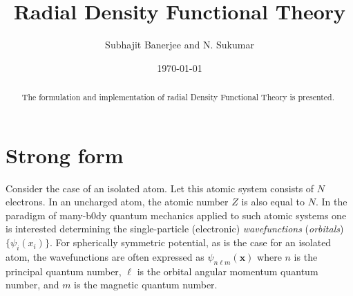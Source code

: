 \documentclass[12pt,dvipsnames]{article}
\newcommand{\vm}[1]{\mathbf{#1}}
\newcommand{\vx}{\vm{x}}
\begin{document}
\title{Radial Density Functional Theory}
\author{Subhajit Banerjee and N. Sukumar}
\date{\today}
\maketitle

\begin{abstract}
The formulation and implementation of radial Density Functional 
Theory is presented.  
\end{abstract}

\section{Strong form}
Consider the case of an isolated atom. Let this atomic system consists of 
$N$ electrons. In an uncharged atom, the atomic number $Z$ is also 
equal to $N$. In the paradigm of many-b0dy quantum  
mechanics applied to such atomic systems one is interested determining the 
single-particle (electronic) \emph{wavefunctions} (\emph{orbitals}) $\{ \psi_i(x_i) \}$. 
For spherically symmetric potential, as is the case for an isolated atom, the 
wavefunctions are often expressed as $\psi_{n \ell m} (\vx)$ where $n$ is the principal quantum number, 
$\ell$ is the orbital angular momentum quantum number, and $m$ is the magnetic quantum number. 
\end{document}
